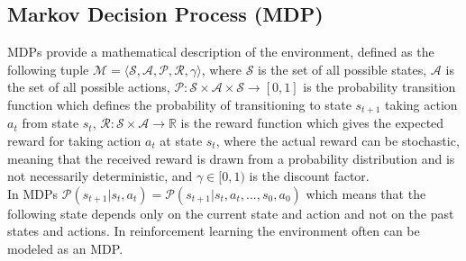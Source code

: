 \documentclass[12pt,a4paper]{report}
\begin{document}
\subsection{Markov Decision Process (MDP)}
MDPs provide a mathematical description of the environment, defined as the following tuple $\mathcal{M}=\langle\mathcal{S},\mathcal{A},\mathcal{P},\mathcal{R},\gamma\rangle$, where $\mathcal{S}$ is the set of all possible states, $\mathcal{A}$ is the set of all possible actions, $\mathcal{P}:\mathcal{S}\times\mathcal{A}\times\mathcal{S}\to[0,1]$ is the probability transition function which defines the probability of transitioning to state $s_{t+1}$ taking action $a_t$ from state $s_t$, \( \mathcal{R} : \mathcal{S} \times \mathcal{A} \to \mathbb{R} \) is the reward function which gives the expected reward for taking action \( a_t \) at state \( s_t \), where the actual reward can be stochastic, meaning that the received reward is drawn from a probability distribution and is not necessarily deterministic, and $\gamma\in[0,1)$ is the discount factor.\\
In MDPs $\mathcal{P}(s_{t+1}|s_t,a_t)=\mathcal{P}(s_{t+1}|s_t,a_t,\dots,s_0,a_0)$ which means that the following state depends only on the current state and action and not on the past states and actions. In reinforcement learning the environment often can be modeled as an MDP.
\end{document}
